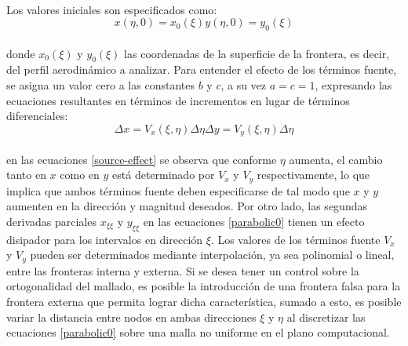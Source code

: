 \documentclass[letterpaper, openright, 12pt]{book}
\begin{document}
    \paragraph*{}
        Los valores iniciales son especificados como:
        \begin{subequations}
            \begin{equation}
                x(\eta, 0) = x_0(\xi)
            \end{equation}
            \begin{equation}
                y(\eta, 0) = y_0(\xi)
            \end{equation}
        \end{subequations}\\
        donde $x_0(\xi)$ y $y_0(\xi)$ las coordenadas de la superficie de la
        frontera, es decir, del perfil aerodinámico a analizar. Para entender el
        efecto de los términos fuente, se asigna un valor cero a las constantes
        $b$ y $c$, a su vez $a = c = 1$, expresando las ecuaciones resultantes
        en términos de incrementos en lugar de términos diferenciales:
        \begin{subequations}
            \begin{equation}
                \Delta x = V_x(\xi, \eta) \Delta \eta
            \end{equation}
            \begin{equation}
                \Delta y = V_y(\xi, \eta) \Delta \eta
            \end{equation}
            \label{source-effect}
        \end{subequations}\\
        en las ecuaciones \ref{source-effect} se observa que conforme $\eta$
        aumenta, el cambio tanto en $x$ como en $y$ está determinado por $V_x$
        y $V_y$ respectivamente, lo que implica que ambos términos fuente deben
        especificarse de tal modo que $x$ y $y$ aumenten en la dirección y
        magnitud deseados. Por otro lado, las segundas derivadas parciales
        $x_{\xi\xi}$ y $y_{\xi\xi}$ en las ecuaciones \ref{parabolic0} tienen un
        efecto disipador para los intervalos en dirección $\xi$. Los valores de
        los términos fuente $V_x$ y $V_y$ pueden ser determinados mediante
        interpolación, ya sea polinomial o lineal, entre las fronteras interna y
        externa. Si se desea tener un control sobre la ortogonalidad del
        mallado, es posible la introducción de una frontera falsa para la
        frontera externa que permita lograr dicha característica, sumado a esto,
        es posible variar la distancia entre nodos en ambas direcciones $\xi$ y
        $\eta$ al discretizar las ecuaciones \ref{parabolic0} sobre una malla no
        uniforme en el plano computacional.
\end{document}
